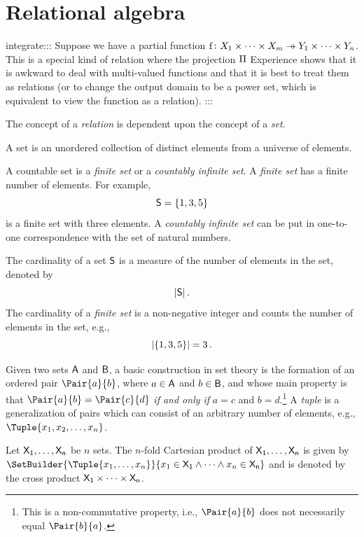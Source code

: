 \documentclass[11pt,final,hidelinks]{article}
\begin{document}
\providecommand{\mainx}{..}
\section{Relational algebra}
\label{sec:relations}
integrate:::
Suppose we have a partial function $\Fun{f} \colon X_1 \times \cdots \times X_m \pfun Y_1 \times \cdots \times Y_n$.
This is a special kind of relation where the projection $\Pi$
Experience shows that it is awkward to deal with multi-valued functions and that it is best to treat them as relations (or to change the output domain to be a power set, which is equivalent to view the function as a relation).
:::



The concept of a \emph{relation} is dependent upon the concept of a \emph{set}.
\begin{definition}
A set is an unordered collection of distinct elements from a universe of elements.
\end{definition}
A countable set is a \emph{finite set} or a \emph{countably infinite set}. A \emph{finite set} has a finite number of elements. For example,
\[
    \Set{S} = \{ 1, 3, 5 \}
\]
is a finite set with three elements. A \emph{countably infinite set} can be put in one-to-one correspondence with the set of natural numbers.

The cardinality of a set $\Set{S}$ is a measure of the number of elements in the set, denoted by
\begin{equation}
    \Card{\Set{S}}\,.
\end{equation}
The cardinality of a \emph{finite set} is a non-negative integer and counts the number of elements in the set, e.g.,
\[
    \lvert\left\{ 1, 3, 5\right\}\rvert = 3\,.
\]

Given two sets $\Set{A}$ and $\Set{B}$, a basic construction in set theory is the formation of an ordered pair $\Pair{a}{b}$, where $a \in \Set{A}$ and $b \in \Set{B}$, and whose main property is that $\Pair{a}{b} = \Pair{c}{d}$ \emph{if and only if} $a = c$ and $b = d$.\footnote{This is a non-commutative property, i.e., $\Pair{a}{b}$ does not necessarily equal $\Pair{b}{a}$.} A \emph{tuple} is a generalization of pairs which can consist of an arbitrary number of elements, e.g., $\Tuple{x_1,x_2,\ldots,x_n}$.

\begin{definition}
Let $\Set{X}[1], \ldots, \Set{X}[n]$ be $n$ sets. The $n$-fold Cartesian product of $\Set{X}[1],\ldots,\Set{X}[n]$ is given by $\SetBuilder{\Tuple{x_1,\ldots,x_n}}{x_1 \in \Set{X}[1] \land \cdots \land x_n \in \Set{X}[n]}$ and is denoted by the cross product $\Set{X}[1] \times \cdots \times \Set{X}[n]$.
\end{definition}
\end{document}
